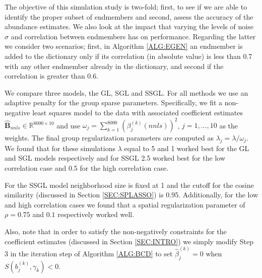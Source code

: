 \documentclass{article}
\numberwithin{equation}{section}
\theoremstyle{plain}
\begin{document}
 
The objective of this simulation study is two-fold; first, to see if we are able
to identify the proper subset of endmembers and second, assess the accuracy of
the abundance estimates. We also look at the impact that varying the levels of
noise $\sigma$ and correlation between endmembers has on performance.
Regarding the latter we consider two scenarios; first, in Algorithm
\ref{ALG:EGEN} an endmember is added to the dictionary only if its correlation
(in absolute value) is less than 0.7 with any other endmember already in the
dictionary, and second if the correlation is greater than 0.6.


We compare three models, the GL, SGL and SSGL.
For all methods we use an adaptive penalty for the group sparse parameters.
Specifically, we fit a non-negative least squares model to the data with
associated coefficient estimates $\hat{\mathbf{B}}_{nnls} \in \mathbb{R}^{8000
\times 10}$ and use $\omega_j = \sum_{k=1}^{8000} (\beta^{(k)}_j(nnls))^2$, $j =
1,\ldots,10$ as the weights.
The final group regularization parameters are computed as $\lambda_j =
\lambda/\omega_j$. We found that for these simulations $\lambda$ equal to 5 and
1 worked best for the GL and SGL models respectively and for SSGL 2.5 worked
best for the low correlation case and 0.5 for the high
correlation case.

For the SSGL model neighborhood size is fixed at 1 and the cutoff for
the cosine similarity (discussed in Section \ref{SEC:SPLASSO}) is 0.95.
Additionally, for the low and high correlation cases we found that a spatial
regularization parameter of $\rho = 0.75$ and $0.1$ respectively worked well. 

Also, note that in order to satisfy the non-negatively constraints for the
coefficient estimates (discussed in Section \ref{SEC:INTRO}) we simply modify
Step 3 in the iteration step of Algorithm \ref{ALG:BCD} to set
$\hat{\beta}_j^{(k)} = 0$ when $S(b_j^{(k)}, \gamma_k) < 0$.
\end{document}

